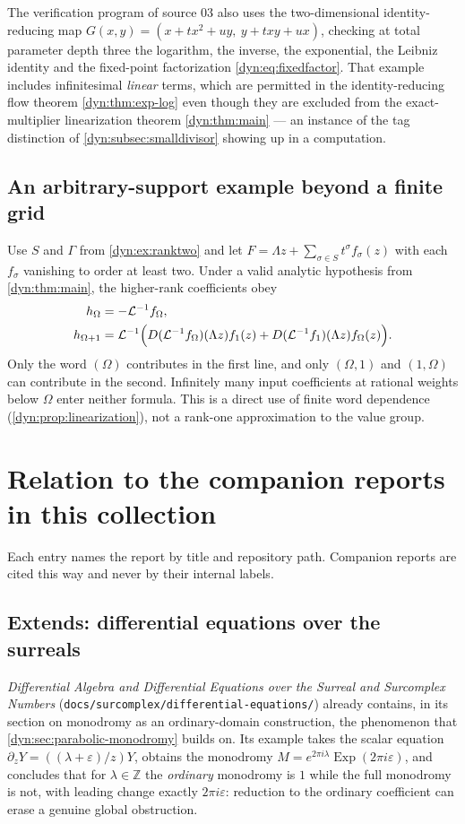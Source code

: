 \documentclass[11pt,letterpaper]{article}
\theoremstyle{definition}
\theoremstyle{remark}
\newcommand{\Z}{\mathbb Z}
\newcommand{\Li}{\mathcal L}
\newcommand{\eps}{\varepsilon}
\numberwithin{equation}{section}
\begin{document}
The verification program of source 03 also uses the two-dimensional
identity-reducing map
$G(x,y)=(x+tx^{2}+uy,\ y+txy+ux)$, checking at total parameter depth three
the logarithm, the inverse, the exponential, the Leibniz identity and the
fixed-point factorization \eqref{dyn:eq:fixedfactor}. That example includes
infinitesimal \emph{linear} terms, which are permitted in the
identity-reducing flow theorem \cref{dyn:thm:exp-log} even though they are
excluded from the exact-multiplier linearization theorem
\cref{dyn:thm:main} --- an instance of the tag distinction of
\cref{dyn:subsec:smalldivisor} showing up in a computation.

\subsection{An arbitrary-support example beyond a finite grid}
\label{dyn:ex:Omega}
Use $S$ and $\Gamma$ from \cref{dyn:ex:ranktwo} and let
$F=\Lambda z+\sum_{\sigma\in S}t^{\sigma}f_\sigma(z)$ with each
$f_\sigma$ vanishing to order at least two. Under a valid analytic
hypothesis from \cref{dyn:thm:main}, the higher-rank coefficients obey
\begin{align}\label{dyn:eq:Omega-example}
 h_\Omega&=-\Li^{-1}f_\Omega,\\
 h_{\Omega+1}&=\Li^{-1}\Bigl(
 D(\Li^{-1}f_\Omega)(\Lambda z)f_1(z)
 +D(\Li^{-1}f_1)(\Lambda z)f_\Omega(z)\Bigr).\notag
\end{align}
Only the word $(\Omega)$ contributes in the first line, and only
$(\Omega,1)$ and $(1,\Omega)$ can contribute in the second. Infinitely many
input coefficients at rational weights below $\Omega$ enter neither
formula. This is a direct use of finite word dependence
(\cref{dyn:prop:linearization}), not a rank-one approximation to the value
group.

\section{Relation to the companion reports in this collection}
\label{dyn:sec:companions}

Each entry names the report by title and repository path. Companion reports
are cited this way and never by their internal labels.

\subsection{Extends: differential equations over the surreals}
\label{dyn:subsec:diffeq}
\emph{Differential Algebra and Differential Equations over the Surreal and
Surcomplex Numbers} (\texttt{docs/surcomplex/differential-equations/})
already contains, in its section on monodromy as an ordinary-domain
construction, the phenomenon that
\cref{dyn:sec:parabolic-monodromy} builds on. Its example takes the scalar
equation $\partial_zY=((\lambda+\eps)/z)Y$, obtains the monodromy
$M=e^{2\pi i\lambda}\operatorname{Exp}(2\pi i\eps)$, and concludes that for
$\lambda\in\Z$ the \emph{ordinary} monodromy is $1$ while the full
monodromy is not, with leading change exactly $2\pi i\eps$: reduction to
the ordinary coefficient can erase a genuine global obstruction.
\end{document}

